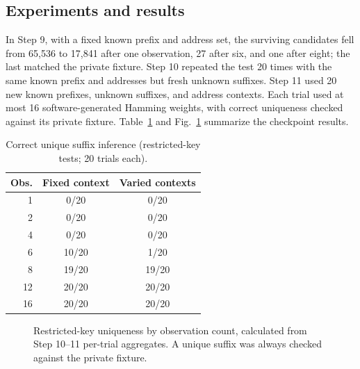 \documentclass[conference,a4paper,10pt]{IEEEtran}
\begin{document}
\subsection{Experiments and results}
In Step 9, with a fixed known prefix and address set, the surviving candidates fell from 65,536 to 17,841 after one observation, 27 after six, and one after eight; the last matched the private fixture. Step 10 repeated the test 20 times with the same known prefix and addresses but fresh unknown suffixes. Step 11 used 20 new known prefixes, unknown suffixes, and address contexts. Each trial used at most 16 software-generated Hamming weights, with correct uniqueness checked against its private fixture. Table~\ref{tab:success} and Fig.~\ref{fig:success} summarize the checkpoint results.

\begin{table}[t]
\centering
\caption{Correct unique suffix inference (restricted-key tests; 20 trials each).}
\label{tab:success}
\footnotesize
\begin{tabular}{@{}rcc@{}}
\toprule
Obs. & Fixed context & Varied contexts\\
\midrule
1 & 0/20 & 0/20\\
2 & 0/20 & 0/20\\
4 & 0/20 & 0/20\\
6 & 10/20 & 1/20\\
8 & 19/20 & 19/20\\
12 & 20/20 & 20/20\\
16 & 20/20 & 20/20\\
\bottomrule
\end{tabular}
\end{table}

\begin{figure}[t]
\centering
{}
\caption{Restricted-key uniqueness by observation count, calculated from Step 10--11 per-trial aggregates. A unique suffix was always checked against the private fixture.}
\label{fig:success}
\end{figure}
\end{document}
